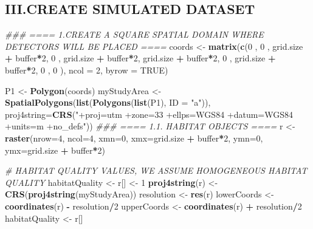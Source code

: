 \documentclass[
]{article}
\newenvironment{Shaded}{\begin{snugshade}}{\end{snugshade}}
\newcommand{\CommentTok}[1]{\textcolor[rgb]{0.56,0.35,0.01}{\textit{#1}}}
\newcommand{\DataTypeTok}[1]{\textcolor[rgb]{0.13,0.29,0.53}{#1}}
\newcommand{\DecValTok}[1]{\textcolor[rgb]{0.00,0.00,0.81}{#1}}
\newcommand{\KeywordTok}[1]{\textcolor[rgb]{0.13,0.29,0.53}{\textbf{#1}}}
\newcommand{\NormalTok}[1]{#1}
\newcommand{\OperatorTok}[1]{\textcolor[rgb]{0.81,0.36,0.00}{\textbf{#1}}}
\newcommand{\OtherTok}[1]{\textcolor[rgb]{0.56,0.35,0.01}{#1}}
\newcommand{\StringTok}[1]{\textcolor[rgb]{0.31,0.60,0.02}{#1}}
\begin{document}
\hypertarget{iii.create-simulated-dataset}{%
\subsection{III.CREATE SIMULATED
DATASET}\label{iii.create-simulated-dataset}}

\begin{Shaded}
\begin{Highlighting}[]
\CommentTok{### ==== 1.CREATE A SQUARE SPATIAL DOMAIN WHERE DETECTORS WILL BE PLACED  ==== }
\NormalTok{coords <-}\StringTok{ }\KeywordTok{matrix}\NormalTok{(}\KeywordTok{c}\NormalTok{(}\DecValTok{0}\NormalTok{                   , }\DecValTok{0}\NormalTok{                   ,}
\NormalTok{                   grid.size }\OperatorTok{+}\StringTok{ }\NormalTok{buffer}\OperatorTok{*}\DecValTok{2}\NormalTok{, }\DecValTok{0}\NormalTok{                   ,}
\NormalTok{                   grid.size }\OperatorTok{+}\StringTok{ }\NormalTok{buffer}\OperatorTok{*}\DecValTok{2}\NormalTok{, grid.size }\OperatorTok{+}\StringTok{ }\NormalTok{buffer}\OperatorTok{*}\DecValTok{2}\NormalTok{,}
                   \DecValTok{0}\NormalTok{                   , grid.size }\OperatorTok{+}\StringTok{ }\NormalTok{buffer}\OperatorTok{*}\DecValTok{2}\NormalTok{,}
                   \DecValTok{0}\NormalTok{                   , }\DecValTok{0} 
\NormalTok{), }\DataTypeTok{ncol =} \DecValTok{2}\NormalTok{, }\DataTypeTok{byrow =} \OtherTok{TRUE}\NormalTok{)}

\NormalTok{P1 <-}\StringTok{ }\KeywordTok{Polygon}\NormalTok{(coords)}
\NormalTok{myStudyArea <-}\StringTok{  }\KeywordTok{SpatialPolygons}\NormalTok{(}\KeywordTok{list}\NormalTok{(}\KeywordTok{Polygons}\NormalTok{(}\KeywordTok{list}\NormalTok{(P1), }\DataTypeTok{ID =} \StringTok{"a"}\NormalTok{)),}
\DataTypeTok{proj4string=}\KeywordTok{CRS}\NormalTok{(}\StringTok{"+proj=utm +zone=33 +ellps=WGS84 +datum=WGS84 +units=m +no_defs"}\NormalTok{))}
\CommentTok{### ====  1.1. HABITAT OBJECTS  ====}
\NormalTok{r <-}\StringTok{ }\KeywordTok{raster}\NormalTok{(}\DataTypeTok{nrow=}\DecValTok{4}\NormalTok{, }\DataTypeTok{ncol=}\DecValTok{4}\NormalTok{, }\DataTypeTok{xmn=}\DecValTok{0}\NormalTok{, }\DataTypeTok{xmx=}\NormalTok{grid.size }\OperatorTok{+}\StringTok{ }\NormalTok{buffer}\OperatorTok{*}\DecValTok{2}\NormalTok{,}
            \DataTypeTok{ymn=}\DecValTok{0}\NormalTok{, }\DataTypeTok{ymx=}\NormalTok{grid.size }\OperatorTok{+}\StringTok{ }\NormalTok{buffer}\OperatorTok{*}\DecValTok{2}\NormalTok{)}

\CommentTok{# HABITAT QUALITY VALUES, WE ASSUME HOMOGENEOUS HABITAT QUALITY}
\NormalTok{habitatQuality <-}\StringTok{ }\NormalTok{r[] <-}\StringTok{ }\DecValTok{1} 
\KeywordTok{proj4string}\NormalTok{(r) <-}\StringTok{ }\KeywordTok{CRS}\NormalTok{(}\KeywordTok{proj4string}\NormalTok{(myStudyArea))}
\NormalTok{resolution <-}\StringTok{ }\KeywordTok{res}\NormalTok{(r)}
\NormalTok{lowerCoords <-}\StringTok{ }\KeywordTok{coordinates}\NormalTok{(r) }\OperatorTok{-}\StringTok{ }\NormalTok{resolution}\OperatorTok{/}\DecValTok{2}
\NormalTok{upperCoords <-}\StringTok{ }\KeywordTok{coordinates}\NormalTok{(r) }\OperatorTok{+}\StringTok{ }\NormalTok{resolution}\OperatorTok{/}\DecValTok{2}
\NormalTok{habitatQuality <-}\StringTok{ }\NormalTok{r[]}


\end{Highlighting}
\end{Shaded}
\end{document}
